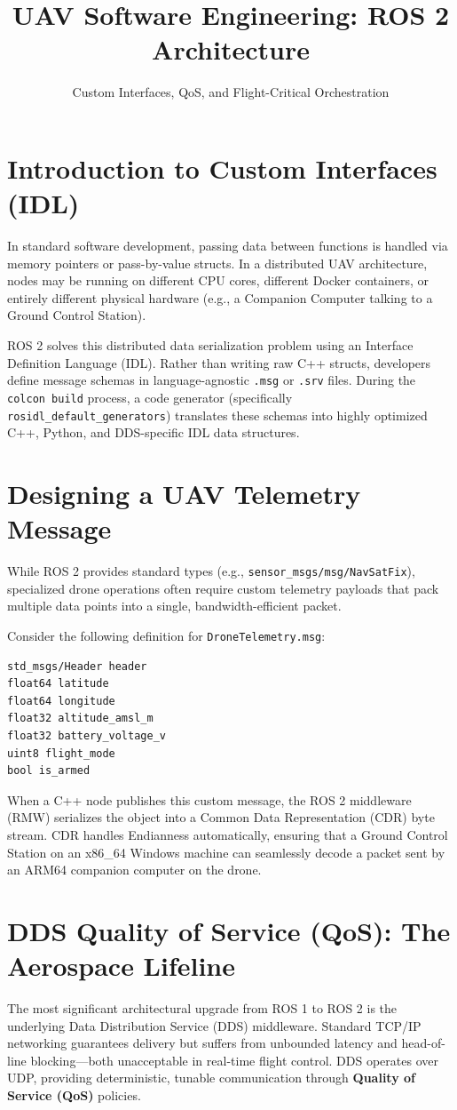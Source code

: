 \documentclass{article}
\title{UAV Software Engineering: ROS 2 Architecture}
\author{Custom Interfaces, QoS, and Flight-Critical Orchestration}
\date{}
\begin{document}
\maketitle

\section{Introduction to Custom Interfaces (IDL)}
In standard software development, passing data between functions is handled via memory pointers or pass-by-value structs. 
In a distributed UAV architecture, nodes may be running on different CPU cores, different Docker containers, or entirely different physical 
hardware (e.g., a Companion Computer talking to a Ground Control Station). 

ROS 2 solves this distributed data serialization problem using an Interface Definition Language (IDL). 
Rather than writing raw C++ structs, developers define message schemas in language-agnostic \texttt{.msg} or \texttt{.srv} files. 
During the \texttt{colcon build} process, a code generator (specifically \texttt{rosidl\_default\_generators}) 
translates these schemas into highly optimized C++, Python, and DDS-specific IDL data structures.

\section{Designing a UAV Telemetry Message}
While ROS 2 provides standard types (e.g., \texttt{sensor\_msgs/msg/NavSatFix}), specialized drone operations 
often require custom telemetry payloads that pack multiple data points into a single, bandwidth-efficient packet.

Consider the following definition for \texttt{DroneTelemetry.msg}:
\begin{verbatim}
std_msgs/Header header
float64 latitude
float64 longitude
float32 altitude_amsl_m
float32 battery_voltage_v
uint8 flight_mode
bool is_armed
\end{verbatim}

When a C++ node publishes this custom message, the ROS 2 middleware (RMW) serializes the object into a Common Data Representation (CDR) 
byte stream. CDR handles Endianness automatically, ensuring that a Ground Control Station on an x86\_64 Windows machine can seamlessly decode 
a packet sent by an ARM64 companion computer on the drone.

\section{DDS Quality of Service (QoS): The Aerospace Lifeline}
The most significant architectural upgrade from ROS 1 to ROS 2 is the underlying Data Distribution Service (DDS) middleware. 
Standard TCP/IP networking guarantees delivery but suffers from unbounded latency and head-of-line blocking---both unacceptable in real-time flight
 control. DDS operates over UDP, providing deterministic, tunable communication through \textbf{Quality of Service (QoS)} policies.
\end{document}
